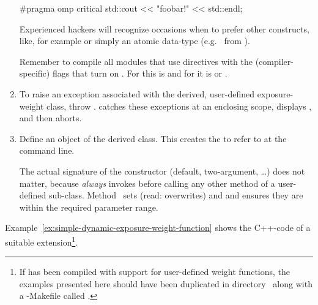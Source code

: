 \begin{enumerate}
  \begin{cxxlisting}
#pragma omp critical
{
    std::cout << "foobar!" << std::endl;
}
  \end{cxxlisting}

  Experienced hackers will recognize occasions when to prefer other
  constructs, like, for example  or simply
  an atomic data-type (e.g.~ from
  ).

  Remember to compile all modules that use  directives
  with the (compiler-specific) flags that turn on .
  For  this is  and for 
  it is  or .

\item
  To raise an exception associated with the derived, user-defined
  exposure-weight class, throw .  \App{}
  catches these exceptions at an enclosing scope, displays
  , and then aborts.

\item
  Define an object of the derived class.  This creates the
   to refer to at the \App{} command line.

  The actual signature of the constructor (default, two-argument,
  \dots) does not matter, because \App{} \emph{always} invokes
   before calling any other method of a user-defined
   sub-class.  Method~ sets
  (read: overwrites)  and  and ensures
  they are within the required parameter range.
\end{enumerate}

Example~\ref{ex:simple-dynamic-exposure-weight-function} shows the
C++-code of a suitable extension\footnote{If \App{} has been compiled
  with support for user-defined weight functions, the examples
  presented here should have been duplicated in
  directory~ along
  with a -Makefile called
  .}.



